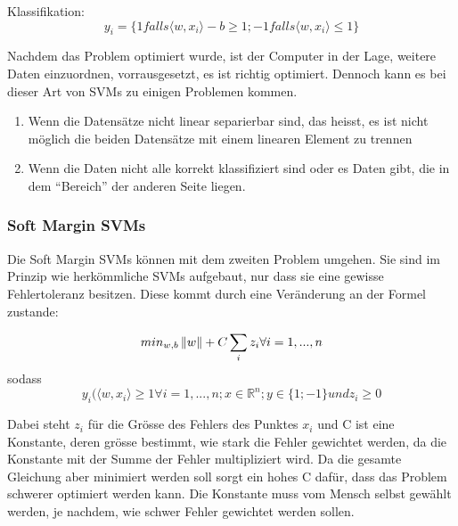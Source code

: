 Klassifikation:
\begin{equation*}
y_{i} = \{1 falls \langle w,x_{i} \rangle - b \geq 1; -1 falls \langle w,x_{i} \rangle \leq 1\}
	\label{KlassifikationSVM}
\end{equation*}

Nachdem das Problem optimiert wurde, ist der Computer in der Lage, weitere Daten einzuordnen, vorrausgesetzt, es ist richtig optimiert.
Dennoch kann es bei dieser Art von SVMs zu einigen Problemen kommen.

\begin{enumerate}
	\item Wenn die Datensätze nicht linear separierbar sind, das heisst, es ist nicht möglich die beiden Datensätze mit einem linearen Element zu trennen
	\item Wenn die Daten nicht alle korrekt klassifiziert sind oder es Daten gibt, die in dem "`Bereich"' der anderen Seite liegen.
\end{enumerate}

\subsubsection{Soft Margin SVMs}
Die Soft Margin SVMs können mit dem zweiten Problem umgehen.
Sie sind im Prinzip wie herkömmliche SVMs aufgebaut, nur dass sie eine gewisse Fehlertoleranz besitzen. Diese kommt durch eine Veränderung an der Formel zustande:

\begin{equation*}
	min_{w,b} \left\lVert w\right\rVert + C\sum_{i}{z_{i}} \forall i = 1,...,n
\end {equation*}
sodass
\begin{equation*}
	 y_{i}(\langle w,x_{i} \rangle \geq 1 \forall i = 1,...,n ; x \in \mathbb{R}^n; y \in \{1; -1\}
	und z_{i} \geq 0
	\label{eq: SoftMarginSVMs}
\end{equation*}

Dabei steht $z_{i}$ für die Grösse des Fehlers des Punktes $x_{i}$ und C ist eine Konstante, deren grösse bestimmt, wie stark die Fehler gewichtet werden, da die Konstante mit der Summe der Fehler multipliziert wird. Da die gesamte Gleichung aber minimiert werden soll sorgt ein hohes C dafür, dass das Problem schwerer optimiert werden kann. Die Konstante muss vom Mensch selbst gewählt werden, je nachdem, wie schwer Fehler gewichtet werden sollen.

